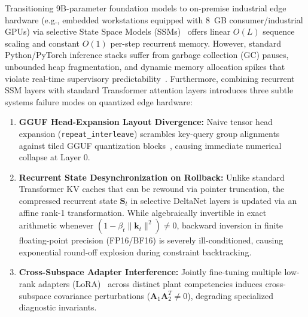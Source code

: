 \documentclass[journal]{IEEEtran}
\begin{document}
Transitioning 9B-parameter foundation models to on-premise industrial edge hardware (e.g., embedded workstations equipped with 8~GB consumer/industrial GPUs) via selective State Space Models (SSMs)~\cite{gu2023mamba,yang2024gateddelta} offers linear $O(L)$ sequence scaling and constant $O(1)$ per-step recurrent memory. However, standard Python/PyTorch inference stacks suffer from garbage collection (GC) pauses, unbounded heap fragmentation, and dynamic memory allocation spikes that violate real-time supervisory predictability~\cite{kopetz2011realtime}. Furthermore, combining recurrent SSM layers with standard Transformer attention layers introduces three subtle systems failure modes on quantized edge hardware:
\begin{enumerate}
    \item \textbf{GGUF Head-Expansion Layout Divergence:} Naive tensor head expansion (\texttt{repeat\_interleave}) scrambles key-query group alignments against tiled GGUF quantization blocks~\cite{gerganov2023llamacpp}, causing immediate numerical collapse at Layer 0.
    \item \textbf{Recurrent State Desynchronization on Rollback:} Unlike standard Transformer KV caches that can be rewound via pointer truncation, the compressed recurrent state $\mathbf{S}_t$ in selective DeltaNet layers is updated via an affine rank-1 transformation. While algebraically invertible in exact arithmetic whenever $(1 - \beta_t \|\mathbf{k}_t\|^2) \neq 0$, backward inversion in finite floating-point precision (FP16/BF16) is severely ill-conditioned, causing exponential round-off explosion during constraint backtracking.
    \item \textbf{Cross-Subspace Adapter Interference:} Jointly fine-tuning multiple low-rank adapters (LoRA)~\cite{hu2022lora} across distinct plant competencies induces cross-subspace covariance perturbations ($\mathbf{A}_1 \mathbf{A}_2^T \neq 0$), degrading specialized diagnostic invariants.
\end{enumerate}
\end{document}
